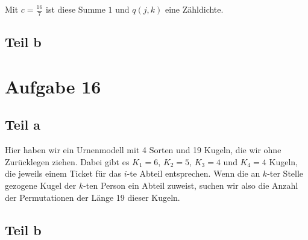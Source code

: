 \documentclass[10pt,a4paper]{article}
\begin{document}
Mit $c = \frac{16}{7}$ ist diese Summe $1$ und $q(j, k)$ eine Zähldichte.

\subsection{Teil b}

\section{Aufgabe 16}

\subsection{Teil a}
Hier haben wir ein Urnenmodell mit 4 Sorten und 19 Kugeln, die wir ohne Zurücklegen ziehen.
Dabei gibt es $K_{1} = 6$, $K_{2} = 5$, $K_{3} = 4$ und $K_{4} = 4$ Kugeln, die jeweils einem Ticket für das $i$-te Abteil entsprechen.
Wenn die an $k$-ter Stelle gezogene Kugel der $k$-ten Person ein Abteil zuweist, suchen wir also die Anzahl der Permutationen der Länge 19 dieser Kugeln.


\subsection{Teil b}
\end{document}
